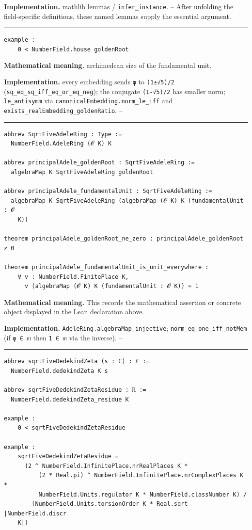 \documentclass[UTF8,a4paper,11pt,fontset=fandol]{ctexart}
\theoremstyle{definition}
\newcommand{\statementsep}{\par\medskip\hrule\medskip}
\begin{document}
\noindent\textbf{Implementation.} mathlib lemmas / \texttt{infer\_\allowbreak{}instance}. -- After unfolding the field-specific definitions, these named lemmas supply the essential argument.\par
\statementsep
\begin{verbatim}
example :
    0 < NumberField.house goldenRoot
\end{verbatim}
\noindent\textbf{Mathematical meaning.} archimedean size of the fundamental unit.\par
\noindent\textbf{Implementation.} every embedding sends \texttt{φ} to \texttt{(1±√5)/\allowbreak{}2} (\texttt{sq\_\allowbreak{}eq\_\allowbreak{}sq\_\allowbreak{}iff\_\allowbreak{}eq\_\allowbreak{}or\_\allowbreak{}eq\_\allowbreak{}neg}); the conjugate \texttt{(1-√5)/\allowbreak{}2} has smaller norm; \texttt{le\_\allowbreak{}antisymm} via \texttt{canonicalEmbedding.\allowbreak{}norm\_\allowbreak{}le\_\allowbreak{}iff} and \texttt{exists\_\allowbreak{}realEmbedding\_\allowbreak{}goldenRatio}. --\par
\statementsep
\begin{verbatim}
abbrev SqrtFiveAdeleRing : Type :=
  NumberField.AdeleRing (𝓞 K) K

abbrev principalAdele_goldenRoot : SqrtFiveAdeleRing :=
  algebraMap K SqrtFiveAdeleRing goldenRoot

abbrev principalAdele_fundamentalUnit : SqrtFiveAdeleRing :=
  algebraMap K SqrtFiveAdeleRing (algebraMap (𝓞 K) K (fundamentalUnit : 𝓞
    K))

theorem principalAdele_goldenRoot_ne_zero : principalAdele_goldenRoot ≠ 0

theorem principalAdele_fundamentalUnit_is_unit_everywhere :
    ∀ v : NumberField.FinitePlace K,
      v (algebraMap (𝓞 K) K (fundamentalUnit : 𝓞 K)) = 1
\end{verbatim}
\noindent\textbf{Mathematical meaning.} This records the mathematical assertion or concrete object displayed in the Lean declaration above.\par
\noindent\textbf{Implementation.} \texttt{AdeleRing.\allowbreak{}algebraMap\_\allowbreak{}injective}; \texttt{norm\_\allowbreak{}eq\_\allowbreak{}one\_\allowbreak{}iff\_\allowbreak{}notMem} (if \texttt{φ ∈ 𝔪} then \texttt{1 ∈ 𝔪} via the inverse). --\par
\statementsep
\begin{verbatim}
abbrev sqrtFiveDedekindZeta (s : ℂ) : ℂ :=
  NumberField.dedekindZeta K s

abbrev sqrtFiveDedekindZetaResidue : ℝ :=
  NumberField.dedekindZeta_residue K

example :
    0 < sqrtFiveDedekindZetaResidue

example :
    sqrtFiveDedekindZetaResidue =
      (2 ^ NumberField.InfinitePlace.nrRealPlaces K *
          (2 * Real.pi) ^ NumberField.InfinitePlace.nrComplexPlaces K *
          NumberField.Units.regulator K * NumberField.classNumber K) /
        (NumberField.Units.torsionOrder K * Real.sqrt |NumberField.discr
    K|)
\end{verbatim}
\end{document}
